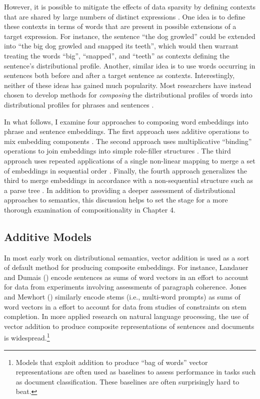 However, it is possible to mitigate the effects of data sparsity by defining contexts that are shared by large numbers of distinct expressions \citep[][p. 261]{Baroni:2014}. One idea is to define these contexts in terms of words that are present in possible extensions of a target expression. For instance, the sentence ``the dog growled'' could be extended into ``the big dog growled and snapped its teeth'', which would then warrant treating the words ``big'', ``snapped'', and ``teeth'' as contexts defining the sentence's distributional profile. Another, similar idea is to use words occurring in sentences both before and after a target sentence as contexts. Interestingly, neither of these ideas has gained much popularity. Most researchers have instead chosen to develop methods for \textit{composing} the distributional profiles of words into distributional profiles for phrases and sentences \citep{Mitchell:2010,Baroni:2014}.

In what follows, I examine four approaches to composing word embeddings into phrase and sentence embeddings. The first approach uses additive operations to mix embedding components \citep{Mitchell:2010,Mikolov:2013}. The second approach uses multiplicative ``binding'' operations to join embeddings into simple role-filler structures \citep{SmolenskyLegendre:2006,Plate:2003,Eliasmith:2013,Smolensky:1990}. The third approach uses repeated applications of a single non-linear mapping to merge a set of embeddings in sequential order \citep{Elman:1990,Elman:1991}. Finally, the fourth approach generalizes the third to merge embeddings in accordance with a non-sequential structure such as a parse tree \citep{Socher:2014,Socher:2011,Tai:2015,Socher:2012,Iyyer:2014,Bottou:2014}. In addition to providing a deeper assessment of distributional approaches to semantics, this discussion helps to set the stage for a more thorough examination of compositionality in Chapter 4. 

\subsection{Additive Models}

In most early work on distributional semantics, vector addition is used as a sort of default method for producing composite embeddings. For instance, Landauer and Dumais (\citeyear{LandauerDumais:1997}) encode sentences as sums of word vectors in an effort to account for data from experiments involving assessments of paragraph coherence. Jones and Mewhort (\citeyear{JonesMewhort:2007}) similarly encode stems (i.e., multi-word prompts) as sums of word vectors in a effort to account for data from studies of constraints on stem completion. In more applied research on natural language processing, the use of vector addition to produce composite representations of sentences and documents is widespread.\footnote{Models that exploit addition to produce ``bag of words'' vector representations are often used as baselines to assess performance in tasks such as document classification. These baselines are often surprisingly hard to beat.} 

